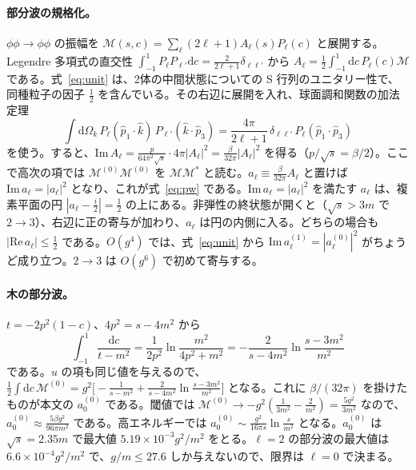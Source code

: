 \documentclass[a4paper,10pt]{ltjsarticle}
\newcommand{\dd}{\mathrm{d}}
\begin{document}
\paragraph{部分波の規格化。}$\phi\phi\to\phi\phi$ の振幅を $\mathcal{M}(s,c)=\sum_\ell(2\ell+1)A_\ell(s)P_\ell(c)$ と展開する。Legendre 多項式の直交性 $\int_{-1}^1P_\ell P_{\ell'}\dd c=\frac{2}{2\ell+1}\delta_{\ell\ell'}$ から $A_\ell=\frac12\int_{-1}^1\dd c\,P_\ell(c)\mathcal{M}$ である。式~\eqref{eq:unit} は、2体の中間状態についての S 行列のユニタリー性で、同種粒子の因子 $\frac12$ を含んでいる。その右辺に展開を入れ、球面調和関数の加法定理
\begin{equation*}
\int\dd\Omega_k\,P_\ell(\hat p_1\cdot\hat k)\,P_{\ell'}(\hat k\cdot\hat p_3)=\frac{4\pi}{2\ell+1}\,\delta_{\ell\ell'}\,P_\ell(\hat p_1\cdot\hat p_3)
\end{equation*}
を使う。すると、$\mathrm{Im}\,A_\ell=\frac{p}{64\pi^2\sqrt s}\cdot4\pi|A_\ell|^2=\frac{\beta}{32\pi}|A_\ell|^2$ を得る（$p/\sqrt s=\beta/2$）。ここで高次の項では $\mathcal{M}^{(0)}\mathcal{M}^{(0)}$ を $\mathcal{M}\mathcal{M}^*$ と読む。$a_\ell\equiv\frac{\beta}{32\pi}A_\ell$ と置けば $\mathrm{Im}\,a_\ell=|a_\ell|^2$ となり、これが式~\eqref{eq:pw} である。$\mathrm{Im}\,a_\ell=|a_\ell|^2$ を満たす $a_\ell$ は、複素平面の円 $|a_\ell-\frac i2|=\frac12$ の上にある。非弾性の終状態が開くと（$\sqrt s>3m$ で $2\to3$）、右辺に正の寄与が加わり、$a_\ell$ は円の内側に入る。どちらの場合も $|\mathrm{Re}\,a_\ell|\le\frac12$ である。$O(g^4)$ では、式~\eqref{eq:unit} から $\mathrm{Im}\,a_\ell^{(1)}=|a_\ell^{(0)}|^2$ がちょうど成り立つ。$2\to3$ は $O(g^6)$ で初めて寄与する。

\paragraph{木の部分波。}$t=-2p^2(1-c)$、$4p^2=s-4m^2$ から
\begin{equation*}
\int_{-1}^1\frac{\dd c}{t-m^2}=\frac{1}{2p^2}\ln\frac{m^2}{4p^2+m^2}=-\frac{2}{s-4m^2}\ln\frac{s-3m^2}{m^2}
\end{equation*}
である。$u$ の項も同じ値を与えるので、$\frac12\int\dd c\,\mathcal{M}^{(0)}=g^2\bigl[-\frac{1}{s-m^2}+\frac{2}{s-4m^2}\ln\frac{s-3m^2}{m^2}\bigr]$ となる。これに $\beta/(32\pi)$ を掛けたものが本文の $a_0^{(0)}$ である。閾値では $\mathcal{M}^{(0)}\to-g^2(\frac{1}{3m^2}-\frac{2}{m^2})=\frac{5g^2}{3m^2}$ なので、$a_0^{(0)}\approx\frac{5\beta g^2}{96\pi m^2}$ である。高エネルギーでは $a_0^{(0)}\sim\frac{g^2}{16\pi s}\ln\frac{s}{m^2}$ となる。$a_0^{(0)}$ は $\sqrt s=2.35m$ で最大値 $5.19\times10^{-3}g^2/m^2$ をとる。$\ell=2$ の部分波の最大値は $6.6\times10^{-4}g^2/m^2$ で、$g/m\le27.6$ しか与えないので、限界は $\ell=0$ で決まる。
\end{document}
